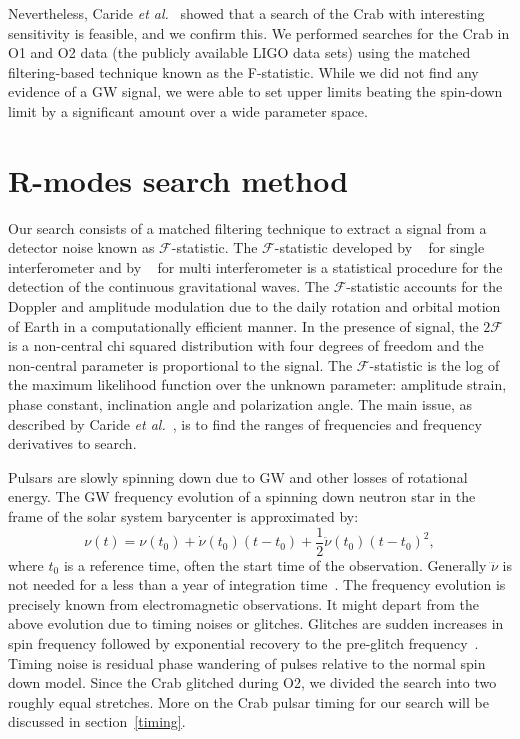 \documentclass{ttuthes2007}
\begin{document}
Nevertheless, Caride \textit{et al.}~\cite{Caride2019} showed that a search of
the Crab with interesting sensitivity is feasible, and we confirm this.
We performed searches for the Crab in  \ac{O1} and \ac{O2} data (the publicly
available LIGO data sets) using the matched filtering-based technique known as
the F-statistic.
While we did not find any evidence of a \ac{GW} signal, we were able to set
upper limits beating the spin-down limit by a significant amount over a wide
parameter space.

\section{R-modes search method} 

Our search consists of a matched filtering technique to extract a signal from a
detector noise known as $\mathcal{F}$-statistic. The $\mathcal{F}$-statistic
developed by ~\citet{Jaranowski_1998} for single interferometer and by
~\citet{PhysRevD.72.063006} for multi interferometer is a statistical procedure
for the detection of the continuous gravitational waves. The
$\mathcal{F}$-statistic accounts for the Doppler and amplitude modulation due
to the daily rotation and orbital motion of Earth in a computationally efficient
manner. In the presence of signal,
the $2\mathcal{F}$ is a non-central chi squared distribution with four degrees
of freedom and the non-central parameter is proportional to the signal. The
$\mathcal{F}$-statistic is the log of the maximum likelihood function over the
unknown parameter: amplitude strain, phase constant, inclination angle and
polarization angle. 
The main issue, as described by Caride \textit{et al.}~\cite{Caride2019}, is to
find the ranges of frequencies and frequency derivatives to search.

Pulsars are slowly spinning down due to \ac{GW} and other losses of rotational
energy. The \ac{GW} frequency evolution of a spinning down neutron star in the
frame of the solar system barycenter is approximated by: 
\begin{equation}
 \nu(t) = \nu\left( t_0 \right) + \dot{\nu}\left( t_0 \right) \left( t-t_0
\right) + \frac{1}{2} \ddot{\nu}\left( t_0 \right) \left( t-t_0 \right)^2,
\end{equation} 
where $t_0$ is a reference time, often the start time of the observation.
Generally $\dddot{\nu}$ is not needed for a less than a year of integration
time~\cite{Caride2019}. The frequency evolution is precisely known from
electromagnetic observations. It might depart from the above evolution due to
timing noises or glitches. Glitches are sudden increases in spin frequency
followed by exponential recovery to the pre-glitch
frequency~\cite{Espinoza_2011}. Timing noise is residual phase wandering of
pulses
relative to the normal spin down model.
Since the Crab glitched during O2, we divided the search into two roughly equal
stretches. More on the Crab pulsar timing for our search will be discussed in
section~\ref{timing}.
\end{document}
